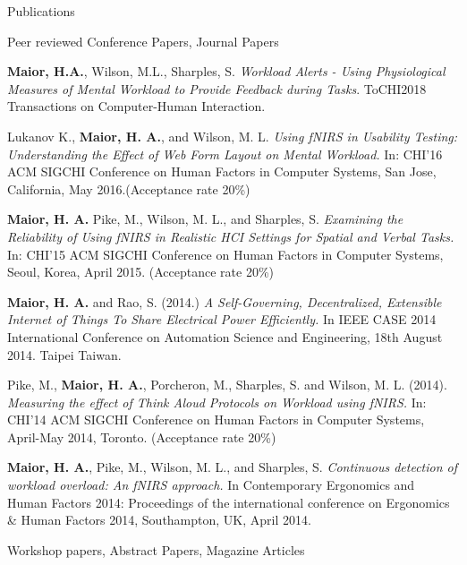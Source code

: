 \documentclass{resume} %
\begin{document}
\begin{rSection}{Publications}
\begin{rSubsection}{ }{ }{ }{Peer reviewed Conference Papers, Journal Papers}
	
\item \textbf{Maior, H.A.}, Wilson, M.L., Sharples, S. \emph{Workload Alerts - Using Physiological Measures of Mental Workload to Provide Feedback during Tasks}.  ToCHI2018 Transactions on Computer-Human Interaction.

\item Lukanov K., \textbf{Maior, H. A.}, and Wilson, M. L. \emph{Using fNIRS in Usability Testing: Understanding the Effect of Web Form Layout on Mental Workload.} In: CHI'16 ACM SIGCHI Conference on Human Factors in Computer Systems, San Jose, California, May 2016.(Acceptance rate 20\%)

\item \textbf{Maior, H. A.} Pike, M., Wilson, M. L., and Sharples, S. \emph{Examining the Reliability of Using fNIRS in Realistic HCI Settings for Spatial and Verbal Tasks.} In: CHI'15 ACM SIGCHI Conference on Human Factors in Computer Systems, Seoul, Korea, April 2015. (Acceptance rate 20\%)

\item \textbf{Maior, H. A.} and Rao, S. (2014.) \emph{A Self-Governing, Decentralized, Extensible Internet of Things To Share Electrical Power Efficiently.} In IEEE CASE 2014 International Conference on Automation Science and Engineering, 18th August 2014. Taipei Taiwan.

\item Pike, M., \textbf{Maior, H. A.}, Porcheron, M., Sharples, S. and Wilson, M. L. (2014). \emph{Measuring the effect of Think Aloud Protocols on Workload using fNIRS.} In: CHI'14 ACM SIGCHI Conference on Human Factors in Computer Systems, April-May 2014, Toronto. (Acceptance rate 20\%)

\item \textbf{Maior, H. A.}, Pike, M., Wilson, M. L., and Sharples, S. \emph{Continuous detection of workload overload: An fNIRS approach.} In Contemporary Ergonomics and Human Factors 2014: Proceedings of the international conference on Ergonomics \& Human Factors 2014, Southampton, UK, April 2014.
\end{rSubsection}

\begin{rSubsection}{ }{ }{ }{Workshop papers, Abstract Papers, Magazine Articles}
	

\end{rSubsection}
\end{rSection}
\end{document}

